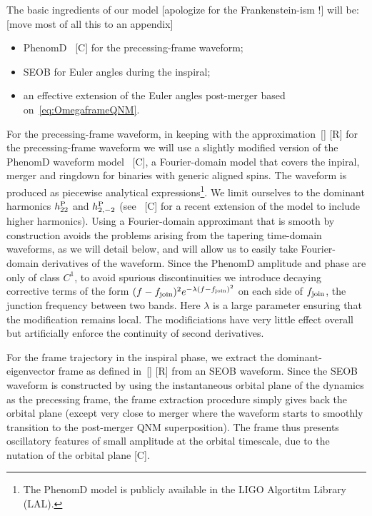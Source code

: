 \documentclass[aps,showpacs,twocolumn,
prd,superscriptaddress,nofootinbib]{revtex4-1}
\newcommand{\SM}[1]{{\color{Red} #1}}
\begin{document}
The basic ingredients of our model \SM{[apologize for the Frankenstein-ism !]} will be: \SM{[move most of all this to an appendix]}
\begin{itemize}
	\item PhenomD~\cite{} \SM{[C]} for the precessing-frame waveform;
	\item SEOB for Euler angles during the inspiral;
	\item an effective extension of the Euler angles post-merger based on~\eqref{eq:OmegaframeQNM}.
\end{itemize}
For the precessing-frame waveform, in keeping with the approximation~\eqref{} \SM{[R]} for the precessing-frame waveform we will use a slightly modified version of the PhenomD waveform model~\cite{} \SM{[C]}, a Fourier-domain model that covers the inpiral, merger and ringdown for binaries with generic aligned spins. The waveform is produced as piecewise analytical expressions\footnote{The PhenomD model is publicly available in the LIGO Algortitm Library (LAL).}. We limit ourselves to the dominant harmonics $h^{\rm P}_{22}$ and $h^{\rm P}_{2,-2}$ (see~\cite{} \SM{[C]} for a recent extension of the model to include higher harmonics). Using a Fourier-domain approximant that is smooth by construction avoids the problems arising from the tapering time-domain waveforms, as we will detail below, and will allow us to easily take Fourier-domain derivatives of the waveform. Since the PhenomD amplitude and phase are only of class $C^{1}$, to avoid spurious discontinuities we introduce decaying corrective terms of the form $(f-f_{\rm join})^{2} e^{-\lambda(f-f_{\rm join})^{2}}$ on each side of $f_{\rm join}$, the junction frequency between two bands. Here $\lambda$ is a large parameter ensuring that the modification remains local. The modificiations have very little effect overall but artificially enforce the continuity of second derivatives.

For the frame trajectory in the inspiral phase, we extract the dominant-eigenvector frame as defined in~\eqref{} \SM{[R]} from an SEOB waveform. Since the SEOB waveform is constructed by using the instantaneous orbital plane of the dynamics as the precessing frame, the frame extraction procedure simply gives back the orbital plane (except very close to merger where the waveform starts to smoothly transition to the post-merger QNM superposition). The frame thus presents oscillatory features of small amplitude at the orbital timescale, due to the nutation of the orbital plane \cite{} \SM{[C]}.
\end{document}
